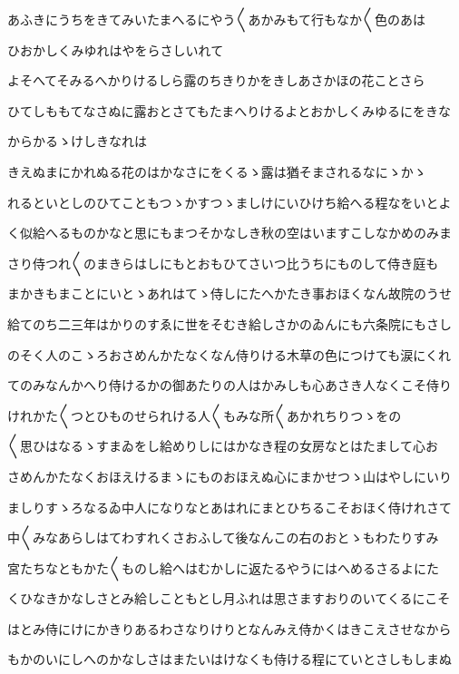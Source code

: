 \documentclass[a4paper,11pt,landscape]{ltjtarticle}
\begin{document}
あふきにうちをきてみいたまへるにやう〱あかみもて行もなか〱色のあは
\par\medskip
ひおかしくみゆれはやをらさしいれて
\par\medskip
よそへてそみるへかりけるしら露のちきりかをきしあさかほの花ことさら
\par\medskip
ひてしももてなさぬに露おとさてもたまへりけるよとおかしくみゆるにをきな
\par\medskip
からかるゝけしきなれは
\par\medskip
きえぬまにかれぬる花のはかなさにをくるゝ露は猶そまされるなにゝかゝ
\par\medskip
れるといとしのひてこともつゝかすつゝましけにいひけち給へる程なをいとよ
\par\medskip
く似給へるものかなと思にもまつそかなしき秋の空はいますこしなかめのみま
\par\medskip
さり侍つれ〱のまきらはしにもとおもひてさいつ比うちにものして侍き庭も
\par\medskip
まかきもまことにいとゝあれはてゝ侍しにたへかたき事おほくなん故院のうせ
\par\medskip
給てのち二三年はかりのすゑに世をそむき給しさかのゐんにも六条院にもさし
\par\medskip
のそく人のこゝろおさめんかたなくなん侍りける木草の色につけても涙にくれ
\par\medskip
てのみなんかへり侍けるかの御あたりの人はかみしも心あさき人なくこそ侍り
\par\medskip
けれかた〱つとひものせられける人〱もみな所〱あかれちりつゝをの
\par\medskip
〱思ひはなるゝすまゐをし給めりしにはかなき程の女房なとはたまして心お
\par\medskip
さめんかたなくおほえけるまゝにものおほえぬ心にまかせつゝ山はやしにいり
\par\medskip
ましりすゝろなるゐ中人になりなとあはれにまとひちるこそおほく侍けれさて
\par\medskip
中〱みなあらしはてわすれくさおふして後なんこの右のおとゝもわたりすみ
\par\medskip
宮たちなともかた〱ものし給へはむかしに返たるやうにはへめるさるよにた
\par\medskip
くひなきかなしさとみ給しこともとし月ふれは思さますおりのいてくるにこそ
\par\medskip
はとみ侍にけにかきりあるわさなりけりとなんみえ侍かくはきこえさせなから
\par\medskip
もかのいにしへのかなしさはまたいはけなくも侍ける程にていとさしもしまぬ
\par\medskip
\end{document}
